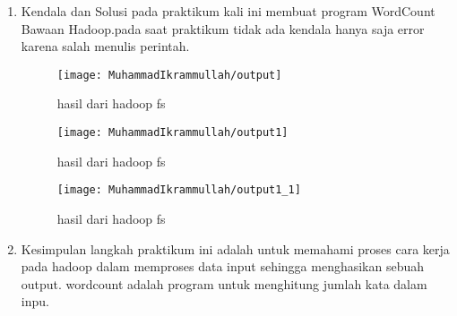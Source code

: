 \begin{enumerate}
\item Kendala dan Solusi
\newline pada praktikum kali ini membuat program WordCount Bawaan Hadoop.pada saat praktikum tidak ada kendala hanya saja error karena salah menulis perintah.

\begin{figure}[!ht]
\texttt{[image: MuhammadIkrammullah/output]}
\caption{hasil dari hadoop fs}
\label{gam:perkuliahan1-10}
\end{figure}

\begin{figure}[!ht]
\texttt{[image: MuhammadIkrammullah/output1]}
\caption{hasil dari hadoop fs}
\label{gam:perkuliahan1-10}
\end{figure}

\begin{figure}[!ht]
\texttt{[image: MuhammadIkrammullah/output1\_1]}
\caption{hasil dari hadoop fs}
\label{gam:perkuliahan1-10}
\end{figure}

\item Kesimpulan
\newline langkah praktikum ini adalah untuk memahami proses cara kerja pada hadoop dalam memproses data input sehingga menghasikan sebuah output. wordcount adalah program untuk menghitung jumlah kata dalam inpu.

\end{enumerate}

